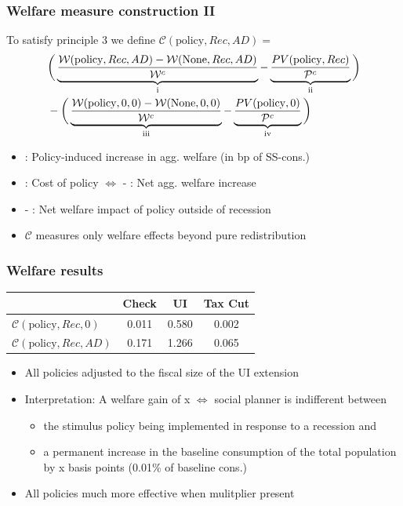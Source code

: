 \documentclass[pdflatex,aspectratio=169]{beamer}
\newcommand{\RNum}[1]{\uppercase\expandafter{\romannumeral #1\relax}}
\begin{document}
\begin{frame}
\frametitle{Welfare measure construction II}

	To satisfy principle 3 we define $\mathcal{C}(\text{policy},Rec,AD) =$
	\begin{align*}
	& \bigg( \underbrace{\frac{\mathcal{W}(\text{policy},Rec,AD)-\mathcal{W}(\text{None},Rec,AD)}{\mathcal{W}^c}}_\text{\RNum{1}}  - \underbrace{\frac{PV(\text{policy},Rec)}{\mathcal{P}^c} }_\text{\RNum{2}} \bigg) \nonumber \\  
	& -
	\bigg( \underbrace{\frac{\mathcal{W}(\text{policy},0,0) - \mathcal{W}(\text{None},0,0)}{\mathcal{W}^c}}_\text{\RNum{3}}  - \underbrace{\frac{PV(\text{policy},0)}{\mathcal{P}^c}}_\text{\RNum{4}}  \bigg) 
	\end{align*}
	
	\begin{itemize}
		\item \RNum{1}: Policy-induced increase in agg. welfare (in bp of SS-cons.)
		\item \RNum{2}: Cost of policy $\Leftrightarrow$ \RNum{1} - \RNum{2}: Net agg. welfare increase
		\item \RNum{3} - \RNum{4}: Net welfare impact of policy outside of recession
		\item $\mathcal{C}$ measures only welfare effects beyond pure redistribution
	\end{itemize}

\end{frame}


\begin{frame}
\frametitle{Welfare results}
\centering 
\begin{tabular}{@{}lccc@{}} 
	\toprule 
	& Check      & UI    & Tax Cut    \\  \midrule 
	$\mathcal{C}(\text{policy},Rec,0)$ & 0.011  & 0.580  & 0.002     \\ 
	$\mathcal{C}(\text{policy},Rec,AD)$ & 0.171  & 1.266  & 0.065     \\ 
\end{tabular}  
\medskip
\begin{itemize}
	\itemsep = .75\bigskipamount 
	\item All policies adjusted to the fiscal size of the UI extension
	\item Interpretation: A welfare gain of x $\Leftrightarrow$ social planner is indifferent between 
	\begin{itemize}
		\itemsep = .25\bigskipamount 
		\item the stimulus policy being implemented in response to a recession and 
		\item a permanent increase in the baseline consumption of the total population by x basis points (0.01\% of baseline cons.)
	\end{itemize}
		\item All policies much more effective when mulitplier present
\end{itemize}
\end{frame}
\end{document}
